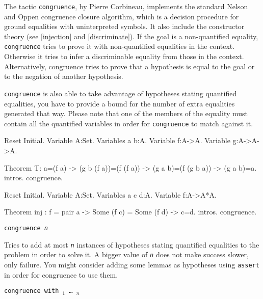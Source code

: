 \begin{coq_example*}
The tactic {\tt congruence}, by Pierre Corbineau, implements the standard Nelson and Oppen
congruence closure algorithm, which is a decision procedure for ground
equalities with uninterpreted symbols. It also include the constructor theory
(see \ref{injection} and \ref{discriminate}).
If the goal is a non-quantified equality, {\tt congruence} tries to
prove it with non-quantified equalities in the context. Otherwise it
tries to infer a discriminable equality from those in the context. Alternatively, congruence tries to prove that a hypothesis is equal to the goal or to the negation of another hypothesis.

{\tt congruence} is also able to take advantage of hypotheses stating quantified equalities, you have to provide a bound for the number of extra equalities generated that way. Please note that one of the members of the equality must contain all the quantified variables in order for {\tt congruence} to match against it.

\begin{coq_eval}
Reset Initial.
Variable A:Set.
Variables a b:A.
Variable f:A->A.
Variable g:A->A->A.
\end{coq_eval}

\begin{coq_example}
Theorem T:
  a=(f a) -> (g b (f a))=(f (f a)) -> (g a b)=(f (g b a)) -> (g a b)=a.
intros.
congruence.
\end{coq_example}

\begin{coq_eval}
Reset Initial.
Variable A:Set.
Variables a c d:A.
Variable f:A->A*A.
\end{coq_eval}

\begin{coq_example}
Theorem inj : f = pair a -> Some (f c) = Some (f d) -> c=d.
intros.
congruence.
\end{coq_example}

\begin{Variants}
 \item {\tt congruence {\sl n}}

  Tries to add at most {\tt \sl n} instances of hypotheses stating quantified equalities to the problem in order to solve it. A bigger value of {\tt \sl n} does not make success slower, only failure. You might consider adding some lemmas as hypotheses using {\tt assert} in order for congruence to use them.

\item {\tt congruence with \term$_1$ \dots\ \term$_n$}


\end{Variants}
\end{coq_example*}
